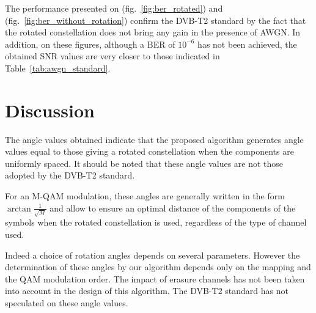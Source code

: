 \begin{table}[t]
    \centering
    \caption{Result of the DVB-T2 system simulation
    under AWGN with and without rotated constellation
    for 16-QAM and 256-QAM.}
    \label{tab:awgn_simulation}

\end{table}


The performance presented on (fig.~\ref{fig:ber_rotated})
and (fig.~\ref{fig:ber_without_rotation}) confirm
the DVB-T2 standard by the fact that the rotated
constellation does not bring any gain in the presence
of AWGN. In addition, on these figures, although
a BER of $10^{-6}$ has not been achieved, the obtained
SNR values are very closer to those indicated in
Table~\ref{tab:awgn_standard}.


\section{Discussion}

The angle values obtained indicate that the proposed
algorithm generates angle values equal to those giving
a rotated constellation when the components are uniformly
spaced. It should be noted that these angle values are
not those adopted by the DVB-T2 standard.

For an M-QAM modulation, these angles are generally
written in the form $\arctan\frac{1}{\sqrt{M}}$ and
allow to ensure an optimal distance of the components
of the symbols when the rotated constellation is used,
regardless of the type of channel used.

Indeed a choice of rotation angles depends on several
parameters. However the determination of these angles
by our algorithm depends only on the mapping and the
QAM modulation order. The impact of erasure channels
has not been taken into account in the design of this
algorithm. The DVB-T2 standard has not speculated on
these angle values.


